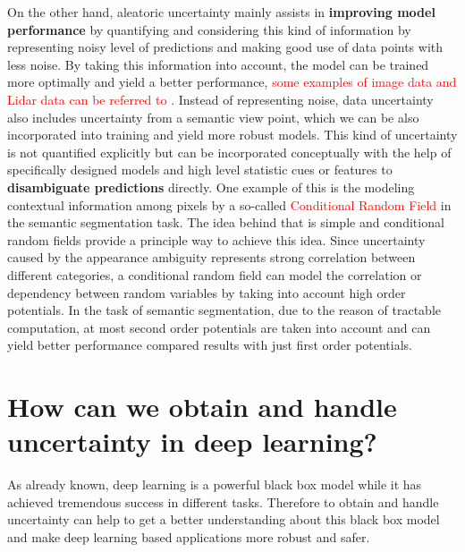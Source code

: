 On the other hand, aleatoric uncertainty mainly assists in \textbf{improving model performance} by quantifying and considering this kind of information by representing noisy level of predictions and making good use of data points with less noise. By taking this information into account, the model can be trained more optimally and yield a better performance, \textcolor{red}{some examples of image data and Lidar data can be referred to \cite{kendall2016modelling}\cite{feng2018towards}}.
Instead of representing noise, data uncertainty also includes uncertainty from a semantic view point, which we can be also incorporated into training and yield more robust models. This kind of uncertainty is not quantified explicitly but can be incorporated conceptually with the help of specifically designed models and high level statistic cues or features to \textbf{disambiguate predictions} directly. One example of this is the modeling contextual information among pixels by a so-called \textcolor{red}{Conditional Random Field}  in the semantic segmentation task\cite{krahenbuhl2011efficient}\cite{sutton2012introduction}\cite{lin2016efficient}. The idea behind that is simple and conditional random fields provide a principle way to achieve this idea. Since uncertainty caused by the appearance ambiguity represents strong correlation between different categories, a conditional random field can model the correlation or dependency between random variables by taking into account high order potentials. In the task of semantic segmentation, due to the reason of tractable computation, at most second order potentials are taken into account and can yield better performance compared results with just first order potentials. 

\newpage

\section{How can we obtain and handle uncertainty in deep learning?}
As already known, deep learning is a powerful black box model while it has achieved tremendous success in different tasks. Therefore to obtain and handle uncertainty can help to get a better understanding about this black box model and make deep learning based applications more robust and safer. 

